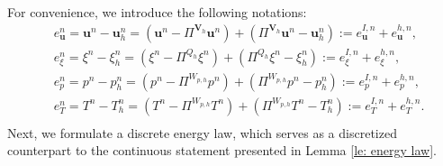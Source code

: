 \documentclass{article}
\numberwithin{equation}{section}
\begin{document}
For convenience, we introduce the following notations:
\begin{equation}\label{e=eI+eh}
\begin{aligned} 
 &e_{\bm u}^n=\bm u^n-\bm u_h^n=( \bm u^n-\Pi^{\bm V_h}\bm u^n)+(\Pi^{\bm V_h}\bm u^n -\bm u_h^n):=e_{\bm u}^{I,n}+e_{\bm u}^{h,n},\\
 &e_{\xi}^n=\xi^n-\xi_h^n=(\xi^n-\Pi^{Q_h}\xi^n)+(\Pi^{Q_h}\xi^n -\xi_h^n):=e_{\xi}^{I,n}+e_{\xi}^{h,n},\\ 
 &e_{p}^n=p^n-p_h^n=(p^n-\Pi^{W_{p,h}} p^n)+(\Pi^{W_{p,h}} p^n -p_h^n):=e_{p}^{I,n}+e_{p}^{h,n},\\ 
 &e_{T}^n=T^n-T_h^n=(T^n-\Pi^{W_{p,h}} T^n)+(\Pi^{W_{p,h}} T^n -T_h^n):=e_{T}^{I,n}+e_{T}^{h,n}.\\
\end{aligned}
\end{equation} 
Next, we formulate a discrete energy law, which serves as a discretized counterpart to the continuous statement presented in Lemma \ref{le: energy law}.
\end{document}
